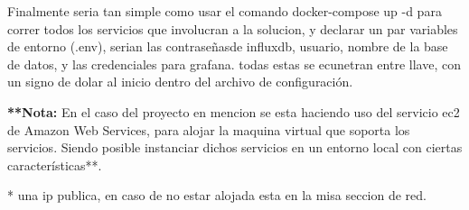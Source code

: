 Finalmente seria tan simple como usar el comando docker-compose up -d para
correr todos los servicios que involucran a la solucion, y declarar un par
variables de entorno (.env), serian las contraseñasde influxdb, usuario, nombre
de la base de datos, y las credenciales para grafana. todas estas se ecunetran
entre llave, con un signo de dolar al inicio dentro del archivo de
configuración.

\textbf{**Nota:} En el caso del proyecto en mencion se esta haciendo uso del
servicio ec2 de Amazon Web Services, para alojar la maquina virtual que soporta
los servicios. Siendo posible instanciar dichos servicios en un entorno local
con ciertas características**.

{\tiny ** una ip publica, en caso de no estar alojada esta en la misa seccion
de red.}



